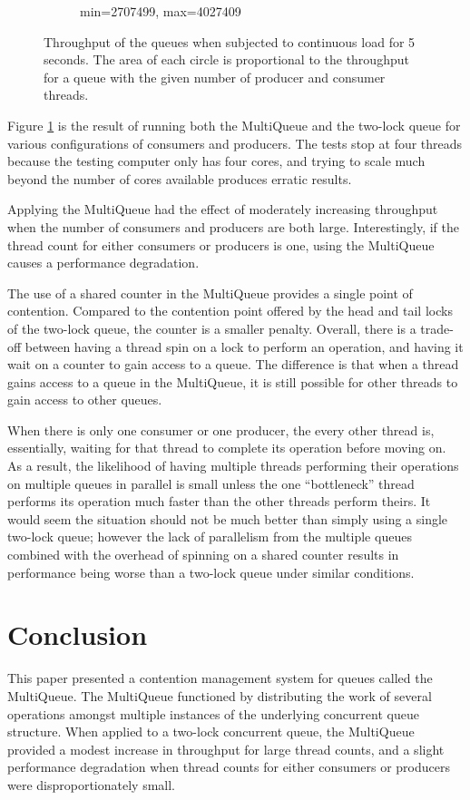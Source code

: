 \documentclass[12pt]{report}
\begin{document}
\begin{figure}[H]
\begin{subfigure}[b]{0.45\textwidth}
        \caption{min=2707499, max=4027409}
    \end{subfigure}
    \caption{Throughput of the queues when subjected to continuous load for 5
    seconds. The area of each circle is proportional to the throughput for a
    queue with the given number of producer and consumer threads.}
    \label{smalltest}
\end{figure}

Figure \ref{smalltest} is the result of running both the MultiQueue and the
two-lock queue for various configurations of consumers and producers. The tests
stop at four threads because the testing computer only has four cores, and
trying to scale much beyond the number of cores available produces erratic
results.

Applying the MultiQueue had the effect of moderately increasing throughput when
the number of consumers and producers are both large. Interestingly, if the
thread count for either consumers or producers is one, using the MultiQueue
causes a performance degradation.

The use of a shared counter in the MultiQueue provides a single point of
contention. Compared to the contention point offered by the head and tail locks
of the two-lock queue, the counter is a smaller penalty. Overall, there is a
trade-off between having a thread spin on a lock to perform an operation, and
having it wait on a counter to gain access to a queue. The difference is that
when a thread gains access to a queue in the MultiQueue, it is still possible
for other threads to gain access to other queues.

When there is only one consumer or one producer, the every other thread is,
essentially, waiting for that thread to complete its operation before moving
on. As a result, the likelihood of having multiple threads performing their
operations on multiple queues in parallel is small unless the one
``bottleneck'' thread performs its operation much faster than the other threads
perform theirs. It would seem the situation should not be much better than
simply using a single two-lock queue; however the lack of parallelism from the
multiple queues combined with the overhead of spinning on a shared counter
results in performance being worse than a two-lock queue under similar
conditions.

\section{Conclusion}
This paper presented a contention management system for queues called the
MultiQueue. The MultiQueue functioned by distributing the work of several
operations amongst multiple instances of the underlying concurrent queue
structure. When applied to a two-lock concurrent queue, the MultiQueue provided
a modest increase in throughput for large thread counts, and a slight
performance degradation when thread counts for either consumers or producers
were disproportionately small.



\end{document}
